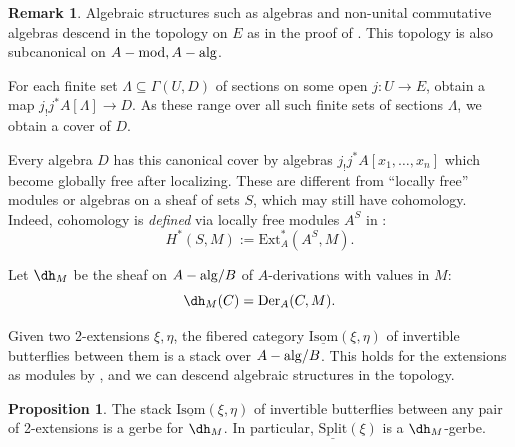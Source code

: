 \documentclass[11pt,reqno]{amsart}
\theoremstyle{definition}
\newtheorem{proposition}[theorem]{Proposition}
\newtheorem{remark}[theorem]{Remark}
\newcommand{\IIsom}{\underline{\textrm{Isom}}}
\newcommand{\Der}{\textrm{Der}}
\newcommand{\dd}[1]{\dh_{#1}}
\newcommand{\Ext}{\textrm{Ext}}
\newcommand{\Split}{\underline{\textrm{Split}}}
\newcommand{\Aalg}{A-{\rm alg}}
\newcommand{\Amod}{A-{\rm mod}}
\begin{document}
\begin{remark}
Algebraic structures such as algebras and non-unital commutative algebras descend in the topology on $E$ as in the proof of \cite[Proposition 2.7]{mymoduledefms}. This topology is also subcanonical on $\Amod, \Aalg$. 

For each finite set $\Lambda \subseteq \Gamma(U, D)$ of sections on some open $j : U \to E$, obtain a map $j_! j^* A[\Lambda] \to D$. As these range over all such finite sets of sections $\Lambda$, we obtain a cover of $D$. 

Every algebra $D$ has this canonical cover by algebras $j_! j^* A[x_1, \dots, x_n]$ which become globally free after localizing. These are different from ``locally free'' modules or algebras on a sheaf of sets $S$, which may still have cohomology. Indeed, cohomology is \emph{defined} via locally free modules $A^S$ in \cite[V.2.1.2]{SGA4}:
\[H^*(S, M) := \Ext^*_A(A^S, M).\]

\end{remark}



Let $\dd{M}$ be the sheaf on $\Aalg/B$ of $A$-derivations with values in $M$:
\[\dd{M}(C) = \Der_A(C, M).\]

Given two 2-extensions $\xi, \eta$, the fibered category $\IIsom(\xi, \eta)$ of invertible butterflies between them is a stack over $\Aalg/B$. This holds for the extensions as modules by \cite[Lemma 4.3]{mymoduledefms}, and we can descend algebraic structures in the topology. 




\begin{proposition}\label{prop:isomdMgerbe}
The stack $\IIsom(\xi, \eta)$ of invertible butterflies between any pair of 2-extensions is a gerbe for $\dd{M}$. In particular, $\Split(\xi)$ is a $\dd{M}$-gerbe. 
\end{proposition}
\end{document}

